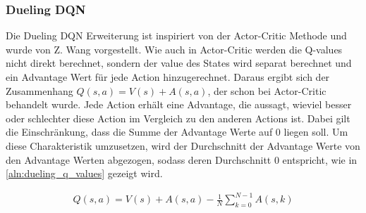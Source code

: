 \documentclass[11pt]{scrartcl}
\begin{document}
\subsubsection{Dueling DQN}
Die Dueling DQN Erweiterung ist inspiriert von der Actor-Critic Methode und wurde von
Z. Wang \cite{wang2015dueling} vorgestellt. Wie auch in Actor-Critic werden die Q-values
nicht direkt berechnet, sondern der value des States wird separat berechnet und ein
Advantage Wert für jede Action hinzugerechnet. Daraus ergibt sich der Zusammenhang
$Q(s, a) = V(s) + A(s, a)$, der schon bei Actor-Critic behandelt wurde. Jede Action erhält
eine Advantage, die aussagt, wieviel besser oder schlechter diese Action im Vergleich zu
den anderen Actions ist. Dabei gilt die Einschränkung, dass die Summe der Advantage Werte
auf 0 liegen soll. Um diese Charakteristik umzusetzen, wird der Durchschnitt der Advantage
Werte von den Advantage Werten abgezogen, sodass deren Durchschnitt 0 entspricht, wie in
\autoref{aln:dueling_q_values} gezeigt wird.

\begin{align}
  Q(s, a) = V(s) + A(s, a) - \frac{1}{N} \sum_{k=0}^{N-1} A(s, k)
  \label{aln:dueling_q_values}
\end{align}
\end{document}

